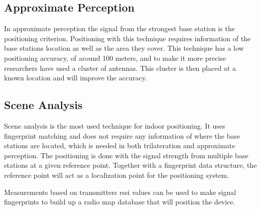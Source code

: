 \subsection{Approximate Perception}\label{sec:theoryRssiApproxPerception}
In approximate perception the signal from the strongest base station is the positioning criterion.
Positioning with this technique requires information of the base stations location as well as the area they cover. 
This technique has a low positioning accuracy, of around 100 meters, and to make it more precise researchers have used a cluster of antennas.
This cluster is then placed at a known location and will improve the accuracy.
\cite{IndoorFingerprintPositioning2017} 

\subsection{Scene Analysis}\label{sec:theoryRssiSceneAnalysis}
Scene analysis is the most used technique for indoor positioning.
It uses fingerprint matching and does not require any information of where the base stations are located, which is needed in both trilateration and approximate perception.
The positioning is done with the signal strength from multiple base stations at a given reference point.
Together with a fingerprint data structure, the reference point will act as a localization point for the positioning system.\cite{IndoorFingerprintPositioning2017} 

\bigskip

Measurements based on transmitters \acrshort{rssi} values can be used to make signal fingerprints to build up a radio map database that will position the device.\cite{DevelopmentMobileIndoor2017} 
